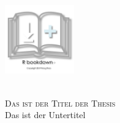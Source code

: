 \begin{titlepage}

\begin{addmargin}[-1cm]{-3cm}
\begin{center}
\large

\hfill
\vfill

\includegraphics[width=3cm]{images/bookdownplus-logo.pdf} \\ \medskip %
\myUni \\ \bigskip

\vspace{3cm}

\begingroup
\huge
\color{Maroon}\textsc{Das ist der Titel der Thesis} \LARGE \\Das ist der Untertitel\\ \bigskip %

\endgroup


\vfill


\mySubtitle \\ \medskip 
\myDegree \\ \bigskip

\vspace{2cm}

\myProf \\
\myOtherProf \\
\myMatrikel \\
\myTime\ 

\vfill

\end{center}
\end{addmargin}

\end{titlepage}




